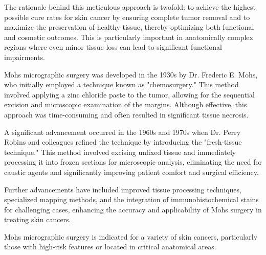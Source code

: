 The rationale behind this meticulous approach is twofold: to achieve the highest possible cure rates for skin cancer by ensuring complete tumor removal and to maximize the preservation of healthy tissue, thereby optimizing both functional and cosmetic outcomes. This is particularly important in anatomically complex regions where even minor tissue loss can lead to significant functional impairments.

Mohs micrographic surgery was developed in the 1930s by Dr. Frederic E. Mohs, who initially employed a technique known as "chemosurgery." This method involved applying a zinc chloride paste to the tumor, allowing for the sequential excision and microscopic examination of the margins. Although effective, this approach was time-consuming and often resulted in significant tissue necrosis.

A significant advancement occurred in the 1960s and 1970s when Dr. Perry Robins and colleagues refined the technique by introducing the "fresh-tissue technique." This method involved excising unfixed tissue and immediately processing it into frozen sections for microscopic analysis, eliminating the need for caustic agents and significantly improving patient comfort and surgical efficiency. 

Further advancements have included improved tissue processing techniques, specialized mapping methods, and the integration of immunohistochemical stains for challenging cases, enhancing the accuracy and applicability of Mohs surgery in treating skin cancers.

Mohs micrographic surgery is indicated for a variety of skin cancers, particularly those with high-risk features or located in critical anatomical areas. 

